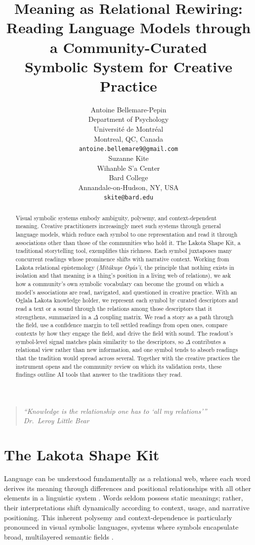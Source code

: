 \documentclass[final,creativeai]{article}
\title{Meaning as Relational Rewiring:\\Reading Language Models through a Community-Curated\\Symbolic System for Creative Practice}
\author{%
  Antoine Bellemare-Pepin \\
  Department of Psychology \\
  Université de Montréal \\
  Montreal, QC, Canada \\
  \texttt{antoine.bellemare9@gmail.com} \\
  \And
  Suzanne Kite \\
  Wihanble S'a Center \\
  Bard College \\
  Annandale-on-Hudson, NY, USA \\
  \texttt{skite@bard.edu} \\
}
\begin{document}
\maketitle

\begin{abstract}
Visual symbolic systems embody ambiguity, polysemy, and context-dependent meaning. Creative practitioners increasingly meet such systems through general language models, which reduce each symbol to one representation and read it through associations other than those of the communities who hold it. The Lakota Shape Kit, a traditional storytelling tool, exemplifies this richness. Each symbol juxtaposes many concurrent readings whose prominence shifts with narrative context. Working from Lakota relational epistemology (\emph{Mitákuye Oyás'i}, the principle that nothing exists in isolation and that meaning is a thing's position in a living web of relations), we ask how a community's own symbolic vocabulary can become the ground on which a model's associations are read, navigated, and questioned in creative practice. With an Oglala Lakota knowledge holder, we represent each symbol by curated descriptors and read a text or a sound through the relations among those descriptors that it strengthens, summarized in a $\Delta$ coupling matrix. We read a story as a path through the field, use a confidence margin to tell settled readings from open ones, compare contexts by how they engage the field, and drive the field with sound. The readout's symbol-level signal matches plain similarity to the descriptors, so $\Delta$ contributes a relational view rather than new information, and one symbol tends to absorb readings that the tradition would spread across several. Together with the creative practices the instrument opens and the community review on which its validation rests, these findings outline AI tools that answer to the traditions they read.
\end{abstract}

\begin{quote}
\itshape ``Knowledge is the relationship one has to `all my relations'{}''\\[0.25em]
\upshape\hfill Dr.\ Leroy Little Bear
\end{quote}

\section{The Lakota Shape Kit}
Language can be understood fundamentally as a relational web, where each word derives its meaning through differences and positional relationships with all other elements in a linguistic system \cite{stawarska_saussures_2020, wood_derrida_1988}. Words seldom possess static meanings; rather, their interpretations shift dynamically according to context, usage, and narrative positioning. This inherent polysemy and context-dependence is particularly pronounced in visual symbolic languages, systems where symbols encapsulate broad, multilayered semantic fields \citep{saint-martin_semiotics_1990}.
\end{document}
